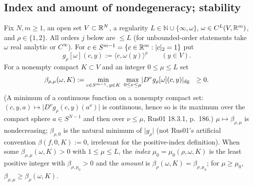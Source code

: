 \subsection{Index and amount of nondegeneracy; stability}\label{bpP:p11a:sec-rank}

\begin{definition}\label{bpP:p11a:index-def}
Fix $N,m\ge1$, an open set $V\subset\mathbb{R}^N$, a regularity $L\in\mathbb N\cup\{\infty,\omega\}$, $\omega\in C^L(V,\mathbb{R}^m)$, and $\rho\in\{1,2\}$. All orders $j$ below are $\le L$ (for unbounded-order statements take $\omega$ real analytic or $C^\infty$). For $c\in S^{m-1}=\{c\in\mathbb{R}^m:\lvert c\rvert_2=1\}$ put
\[g_\rho[\omega](c,y):=\langle c,\omega(y)\rangle^\rho\qquad(y\in V).\]
For a nonempty compact $K\subset V$ and an integer $0\le\mu\le L$ set
\[\beta_{\rho,\mu}(\omega,K):=\min_{c\in S^{m-1},\,y\in K}\ \max_{0\le\nu\le\mu}\dgn{D^\nu g_\rho[\omega](c,y)}\ \ \ge0 .\]
(A minimum of a continuous function on a nonempty compact set: $(c,y,a)\mapsto\lvert D^\nu g_\rho(c,y)(a^\nu)\rvert$ is continuous, hence so is its maximum over the compact sphere $a\in S^{N-1}$ and then over $\nu\le\mu$, Rus01 18.3.1, p.~186.) $\mu\mapsto\beta_{\rho,\mu}$ is nondecreasing; $\beta_{\rho,0}$ is the natural minimum of $\lvert g_\rho\rvert$ (not Rus01's artificial convention $\beta(f,0,K):=0$, irrelevant for the positive-index definition). When some $\beta_{\rho,\mu}(\omega,K)>0$ with $1\le\mu\le L$, the \emph{index} $\mu_0=\mu_0(\rho,\omega,K)$ is the least positive integer with $\beta_{\rho,\mu_0}>0$ and the \emph{amount} is $\beta_\rho(\omega,K)=\beta_{\rho,\mu_0}$; for $\mu\ge\mu_0$, $\beta_{\rho,\mu}\ge\beta_\rho(\omega,K)$.
\end{definition}

